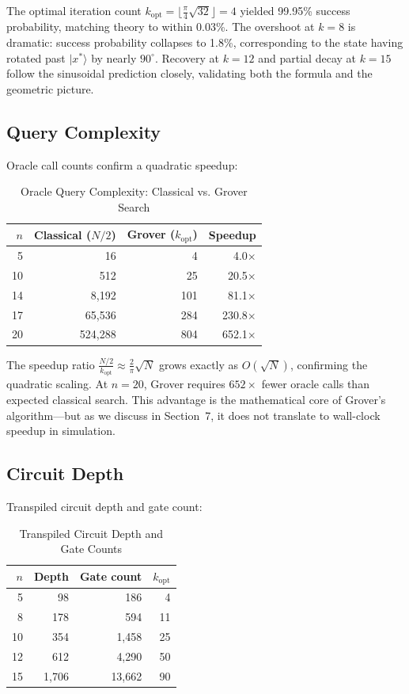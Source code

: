 \documentclass[sigconf, authorversion, nonacm]{acmart}
\begin{document}
The optimal iteration count $k_{\text{opt}} = \lfloor\frac{\pi}{4}\sqrt{32}\rfloor = 4$ yielded 99.95\% success probability, matching theory to within 0.03\%. The overshoot at $k=8$ is dramatic: success probability collapses to 1.8\%, corresponding to the state having rotated past $|x^*\rangle$ by nearly $90^\circ$. Recovery at $k=12$ and partial decay at $k=15$ follow the sinusoidal prediction closely, validating both the formula and the geometric picture.

\subsection{Query Complexity}

Oracle call counts confirm a quadratic speedup:

\begin{table}[htbp]
\centering
\caption{Oracle Query Complexity: Classical vs. Grover Search}
\label{tab:query_complexity}
\begin{tabular}{rrrr}
\toprule
$n$ & Classical ($N/2$) & Grover ($k_{\text{opt}}$) & Speedup \\
\midrule
5  & 16       & 4       & 4.0$\times$ \\
10 & 512      & 25      & 20.5$\times$ \\
14 & 8,192    & 101     & 81.1$\times$ \\
17 & 65,536   & 284     & 230.8$\times$ \\
20 & 524,288  & 804     & 652.1$\times$ \\
\bottomrule
\end{tabular}
\end{table}

The speedup ratio $\frac{N/2}{k_{\text{opt}}} \approx \frac{2}{\pi}\sqrt{N}$ grows exactly as $O(\sqrt{N})$, confirming the quadratic scaling. At $n=20$, Grover requires $652\times$ fewer oracle calls than expected classical search. This advantage is the mathematical core of Grover's algorithm---but as we discuss in Section~7, it does not translate to wall-clock speedup in simulation.

\subsection{Circuit Depth}

Transpiled circuit depth and gate count:

\begin{table}[htbp]
\centering
\caption{Transpiled Circuit Depth and Gate Counts}
\label{tab:circuit_depth}
\begin{tabular}{rrrr}
\toprule
$n$ & Depth & Gate count & $k_{\text{opt}}$ \\
\midrule
5  & 98    & 186    & 4  \\
8  & 178   & 594    & 11 \\
10 & 354   & 1,458  & 25 \\
12 & 612   & 4,290  & 50 \\
15 & 1,706 & 13,662 & 90 \\
\bottomrule
\end{tabular}
\end{table}
\end{document}
